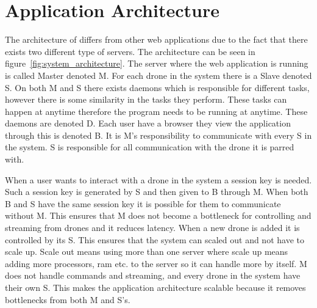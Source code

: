 \section{Application Architecture}

The architecture of \projectname{} differs from other web applications due to the fact that there exists two different type of servers. 
The architecture can be seen in figure~\ref{fig:system_architecture}.
The server where the web application is running is called Master denoted M.
For each drone in the system there is a Slave denoted S. 
On both M and S there exists daemons which is responsible for different tasks, however there is some similarity in the tasks they perform. These tasks can happen at anytime therefore the program needs to be running at anytime. These daemons are denoted D.
Each user have a browser they view the application through this is denoted B.
It is M's responsibility to communicate with every S in the system.
S is responsible for all communication with the drone it is parred with.

When a user wants to interact with a drone in the system a session key is needed. Such a session key is generated by S and then given to B through M. When both B and S have the same session key it is possible for them to communicate without M. This ensures that M does not become a bottleneck for controlling and streaming from drones and it reduces latency.
When a new drone is added it is controlled by its S. This ensures that the system can scaled out and not have to scale up. Scale out means using more than one server where scale up means adding more processors, ram etc. to the server so it can handle more by itself.
M does not handle commands and streaming, and every drone in the system have their own S. This makes the application architecture scalable because it removes bottlenecks from both M and S's.

